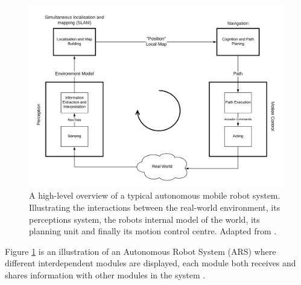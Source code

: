 \begin{figure}[H]
	\centering
	\includegraphics[width=1\linewidth]{"figs/autonomus_overview"}
	\caption[Autonomous robot system overview]{A high-level overview of a typical autonomous mobile robot system. Illustrating the interactions between the real-world environment, its perceptions system, the robots internal model of the world, its planning unit and finally its motion control centre. Adapted from \cite{Siegwart2004}.}
	\label{fig:autoover}
\end{figure}

Figure \ref{fig:autoover} is an illustration of an Autonomous Robot System (ARS) where different interdependent modules are displayed, each module both receives and shares information with other modules in the system \cite{Siegwart2004}. 

